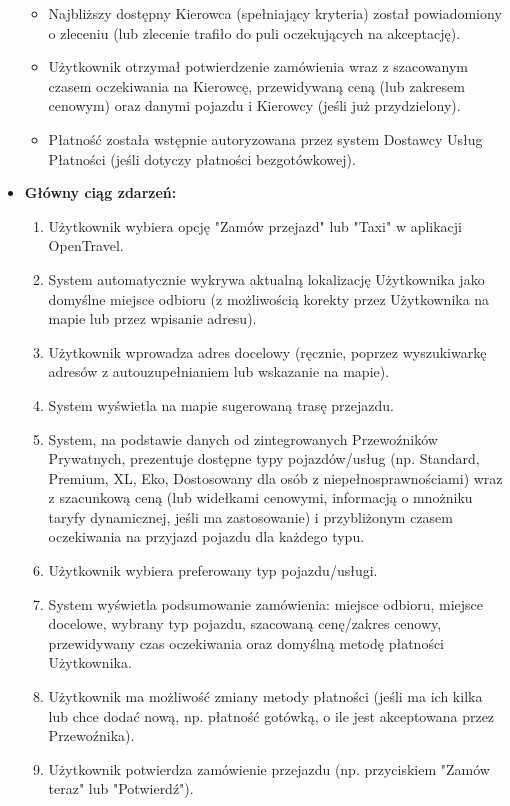 \documentclass[a4paper,12pt]{article}
\begin{document}
\begin{itemize}
\begin{itemize}
            \item Najbliższy dostępny Kierowca (spełniający kryteria) został powiadomiony o zleceniu (lub zlecenie trafiło do puli oczekujących na akceptację).
            \item Użytkownik otrzymał potwierdzenie zamówienia wraz z szacowanym czasem oczekiwania na Kierowcę, przewidywaną ceną (lub zakresem cenowym) oraz danymi pojazdu i Kierowcy (jeśli już przydzielony).
            \item Płatność została wstępnie autoryzowana przez system Dostawcy Usług Płatności (jeśli dotyczy płatności bezgotówkowej).
        \end{itemize}
    \item \textbf{Główny ciąg zdarzeń:}
        \begin{enumerate}
            \item Użytkownik wybiera opcję "Zamów przejazd" lub "Taxi" w aplikacji OpenTravel.
            \item System automatycznie wykrywa aktualną lokalizację Użytkownika jako domyślne miejsce odbioru (z możliwością korekty przez Użytkownika na mapie lub przez wpisanie adresu).
            \item Użytkownik wprowadza adres docelowy (ręcznie, poprzez wyszukiwarkę adresów z autouzupełnianiem lub wskazanie na mapie).
            \item System wyświetla na mapie sugerowaną trasę przejazdu.
            \item System, na podstawie danych od zintegrowanych Przewoźników Prywatnych, prezentuje dostępne typy pojazdów/usług (np. Standard, Premium, XL, Eko, Dostosowany dla osób z niepełnosprawnościami) wraz z szacunkową ceną (lub widełkami cenowymi, informacją o mnożniku taryfy dynamicznej, jeśli ma zastosowanie) i przybliżonym czasem oczekiwania na przyjazd pojazdu dla każdego typu.
            \item Użytkownik wybiera preferowany typ pojazdu/usługi.
            \item System wyświetla podsumowanie zamówienia: miejsce odbioru, miejsce docelowe, wybrany typ pojazdu, szacowaną cenę/zakres cenowy, przewidywany czas oczekiwania oraz domyślną metodę płatności Użytkownika.
            \item Użytkownik ma możliwość zmiany metody płatności (jeśli ma ich kilka lub chce dodać nową, np. płatność gotówką, o ile jest akceptowana przez Przewoźnika).
            \item Użytkownik potwierdza zamówienie przejazdu (np. przyciskiem "Zamów teraz" lub "Potwierdź").

\end{enumerate}
\end{itemize}
\end{document}

